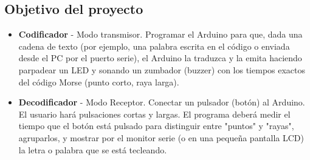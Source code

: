 \subsection{Objetivo del proyecto}
\begin{itemize}
    \item \textbf{Codificador} - Modo transmisor. Programar el Arduino para que, dada una cadena de texto (por ejemplo, una palabra escrita en el código o enviada desde el PC por el puerto serie), el Arduino la traduzca y la emita haciendo parpadear un LED y sonando un zumbador (buzzer) con los tiempos exactos del código Morse (punto corto, raya larga).
    \item \textbf{Decodificador} - Modo Receptor. Conectar un pulsador (botón) al Arduino. El usuario hará pulsaciones cortas y largas. El programa deberá medir el tiempo que el botón está pulsado para distinguir entre "puntos" y "rayas", agruparlos, y mostrar por el monitor serie (o en una pequeña pantalla LCD) la letra o palabra que se está tecleando.
\end{itemize}